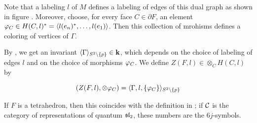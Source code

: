 Note that a labeling $l$ of $M$ defines a labeling of edges of this dual graph as shown in figure . 
Moreover, choose, for every face $C \in \partial F$, an element $\varphi_C \in H(C,l)^*=\langle l(e_n)^*,\dots,l(e_1)\rangle$. Then this 
collection of mrohisms defines a coloring of vertices of $\Gamma$.

By , we get an invariant $\langle\Gamma\rangle_{S^2\setminus\{p\}} \in \mathbf{k}$, which depends on the choice of
 labeling of edges $l$ and on the choice of morphisms $\varphi_C$. We define $Z(F,l) \in \otimes_C H(C,l)$ by

\begin{equation}
	(Z(F,l),\otimes \varphi_C)=\langle\Gamma,l,\{ \varphi_C\}\rangle_{S^2\setminus\{p\}}
\end{equation}

If $F$ is a tetrahedron, then this coincides with the definition in ; if $\mathcal{C}$ is the category of representations 
of quantum $\mathfrak{sl}_2$, these numbers are the $6j$-symbols.

